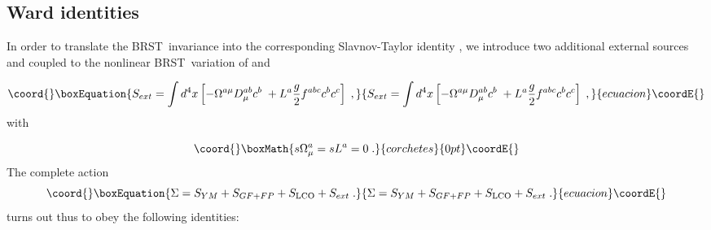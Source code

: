 \documentclass[a4paper,12pt]{article}
\begin{document}
\subsection{Ward identities}

In order to translate the BRST\ invariance \myHighlight{$\left( \ref{sinv}\right) $}\coordHE{} into
the corresponding Slavnov-Taylor identity \cite{book}, we introduce two
additional external sources \coordHE{}and \coordHE{}coupled to
the nonlinear BRST\ variation of \coordHE{}and \coordHE{}

\begin{equation}\coord{}\boxEquation{
S_{ext}=\int d^{4}x\left[ -\Omega ^{a\mu }D_{\mu }^{ab}c^{b}\;+L^{a}\frac{g}{
2}f^{abc}c^{b}c^{c}\right] \;,  \label{om}
}{
S_{ext}=\int d^{4}x\left[ -\Omega ^{a\mu }D_{\mu }^{ab}c^{b}\;+L^{a}\frac{g}{
2}f^{abc}c^{b}c^{c}\right] \;,  }{ecuacion}\coordE{}\end{equation}
with

\[\coord{}\boxMath{
s\Omega _{\mu }^{a}=sL^{a}=0\;. 
}{corchetes}{0pt}\coordE{}\]
The complete action 
\begin{equation}\coord{}\boxEquation{
\Sigma =S_{YM}+S_{GF+FP}+S_{\mathrm{LCO}}+S_{ext}\;.  \label{sl}
}{
\Sigma =S_{YM}+S_{GF+FP}+S_{\mathrm{LCO}}+S_{ext}\;.  }{ecuacion}\coordE{}\end{equation}
turns out thus to obey the following identities:
\end{document}

